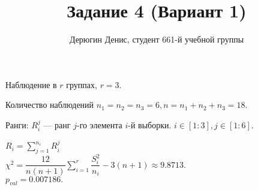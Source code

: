 \documentclass[20pt]{article}
\title{Задание 4 (Вариант 1)}
\author{
	Дерюгин Денис, студент 661-й учебной группы
}
\begin{document}
\large{
\maketitle

Наблюдение в $r$ группах, $r = 3$.

Количество наблюдений $n_1 = n_2 = n_3 = 6, n = n_1 + n_2 + n_3 = 18$.

Ранги: $R_i^j$ --- ранг $j$-го элемента $i$-й выборки. $i \in [1:3], j \in [1:6]$.

$R_i = \sum_{j=1}^{n_i} R_i^j$ \\

$\chi^2 = \dfrac{12}{n(n+1)}\sum_{i=1}^r \dfrac{S_i^2}{n_i} - 3(n + 1) \approx 9.8713$.\\

$p_{val} = 0.007186.$

}
\end{document}
